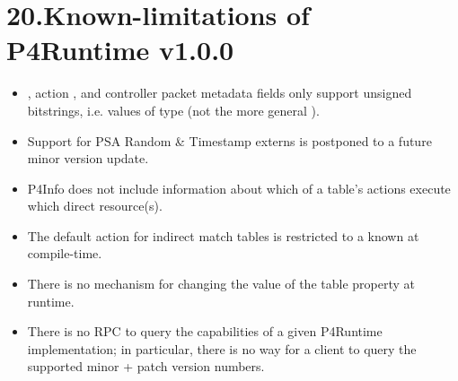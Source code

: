 \documentclass[11pt]{article}
\begin{document}
{%
\section{20.\hspace*{0.5em}Known-limitations of P4Runtime v1.0.0}\label{sec-known-limitations-of-p4runtime-v100}%

\begin{itemize}%

\item{}
, action , and controller packet metadata fields only
support unsigned bitstrings, i.e. values of type  (not the more
general ).%

\item{}
Support for PSA Random \& Timestamp externs is postponed to a future minor
version update.%

\item{}
P4Info does not include information about which of a table's actions execute
which direct resource(s).%

\item{}
The default action for indirect match tables is restricted to a  known at compile-time.%

\item{}
There is no mechanism for changing the value of the 
table property at runtime.%

\item{}
There is no RPC to query the capabilities of a given P4Runtime implementation;
in particular, there is no way for a client to query the supported minor +
patch version numbers.%
\end{itemize}%

}
\end{document}
